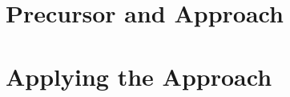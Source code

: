 \documentclass[12pt,oneside]{book}
\begin{document}
\part{Precursor and Approach}







\label{chap:approach}

\part{Applying the Approach}
















	
	
\end{document}
